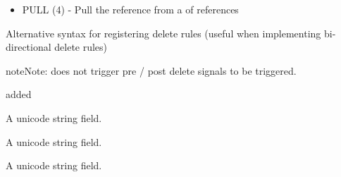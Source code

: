 \documentclass[letterpaper,10pt,english]{sphinxmanual}
\begin{document}
\begin{fulllineitems}
\begin{fulllineitems}
\begin{itemize}
\item {} 
PULL       (4)  - Pull the reference from a  of references

\end{itemize}

Alternative syntax for registering delete rules (useful when implementing
bi-directional delete rules)

\begin{sphinxVerbatim}[commandchars=\\\{\}]
 
      
      

  
\end{sphinxVerbatim}

\begin{sphinxadmonition}{note}{Note:}
 does not trigger pre / post delete signals to be
triggered.
\end{sphinxadmonition}

added 

\end{fulllineitems}


\begin{fulllineitems}
\label{\detokenize{edge:edge.Edge.id}}
A unicode string field.

\end{fulllineitems}


\begin{fulllineitems}
\label{\detokenize{edge:edge.Edge.id_}}
A unicode string field.

\end{fulllineitems}


\begin{fulllineitems}
\label{\detokenize{edge:edge.Edge.label}}
A unicode string field.


\end{fulllineitems}
\end{fulllineitems}
\end{document}
